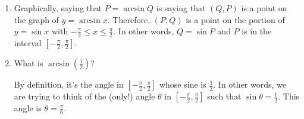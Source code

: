 \documentclass[main]{subfiles}
\begin{document}
\begin{enumerate}
\begin{enumerate}
\begin{solution}
\begin{center}
{
        }
      \end{center}
      From this, we can see that 
    \end{solution}

    \pspace{\newpage}

  \item

    \begin{problem}[0.1in]
    \end{problem}

    \begin{solution} 
      Graphically, saying that $P = \arcsin Q$ is saying that $(Q, P)$
      is a point on the graph of $y = \arcsin x$.  Therefore, $(P, Q)$
      is a point on the portion of $y = \sin x$ with $- \frac{\pi}{2}
      \leq x \leq \frac{\pi}{2}$.  In other words, $Q = \sin P$ and $P$
      is in the interval $\left[ - \frac{\pi}{2}, \frac{\pi}{2}
      \right]$. 
    \end{solution}

    \begin{problem}[\vfill]
    \end{problem}


  \item
    \begin{problem}[\vfill]
      What is $\arcsin \left( \frac{1}{2} \right)$?  
    \end{problem}

    \begin{solution}
      By definition, it's the angle in $\left[ - \frac{\pi}{2},
        \frac{\pi}{2} \right]$ whose sine is $\frac{1}{2}$.  In other
      words, we are trying to think of the (only!) angle $\theta$ in
      $\left[ - \frac{\pi}{2}, \frac{\pi}{2} \right]$ such that $\sin
      \theta = \frac{1}{2}$.  This angle is $\theta =
      \boxed{\frac{\pi}{6}}$.
    \end{solution}


\end{enumerate}
\end{enumerate}
\end{document}
